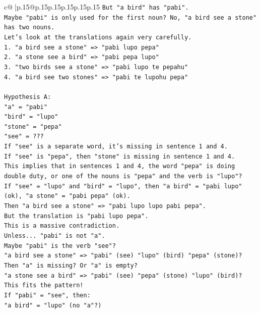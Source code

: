 \documentclass{article}
\begin{document}
{\begin{supertabular}{c@{$\;$}|p{.15\linewidth}@{}p{.15\linewidth}p{.15\linewidth}p{.15\linewidth}p{.15\linewidth}p{.15\linewidth}}
{{{\texttt{But "a bird" has "pabi".} \\
\texttt{Maybe "pabi" is only used for the first noun? No, "a bird see a stone" has two nouns.} \\
\texttt{Let's look at the translations again very carefully.} \\
\texttt{1. "a bird see a stone" => "pabi lupo pepa"} \\
\texttt{2. "a stone see a bird" => "pabi pepa lupo"} \\
\texttt{3. "two birds see a stone" => "pabi lupo te pepahu"} \\
\texttt{4. "a bird see two stones" => "pabi te lupohu pepa"} \\
\\ 
\texttt{Hypothesis A:} \\
\texttt{"a" = "pabi"} \\
\texttt{"bird" = "lupo"} \\
\texttt{"stone" = "pepa"} \\
\texttt{"see" = ???} \\
\texttt{If "see" is a separate word, it's missing in sentence 1 and 4.} \\
\texttt{If "see" is "pepa", then "stone" is missing in sentence 1 and 4.} \\
\texttt{This implies that in sentences 1 and 4, the word "pepa" is doing double duty, or one of the nouns is "pepa" and the verb is "lupo"?} \\
\texttt{If "see" = "lupo" and "bird" = "lupo", then "a bird" = "pabi lupo" (ok), "a stone" = "pabi pepa" (ok).} \\
\texttt{Then "a bird see a stone" => "pabi lupo lupo pabi pepa".} \\
\texttt{But the translation is "pabi lupo pepa".} \\
\texttt{This is a massive contradiction.} \\
\texttt{Unless... "pabi" is not "a".} \\
\texttt{Maybe "pabi" is the verb "see"?} \\
\texttt{"a bird see a stone" => "pabi" (see) "lupo" (bird) "pepa" (stone)?} \\
\texttt{Then "a" is missing? Or "a" is empty?} \\
\texttt{"a stone see a bird" => "pabi" (see) "pepa" (stone) "lupo" (bird)?} \\
\texttt{This fits the pattern!} \\
\texttt{If "pabi" = "see", then:} \\
\texttt{"a bird" = "lupo" (no "a"?)} \\
}}}
\end{supertabular}}
\end{document}
